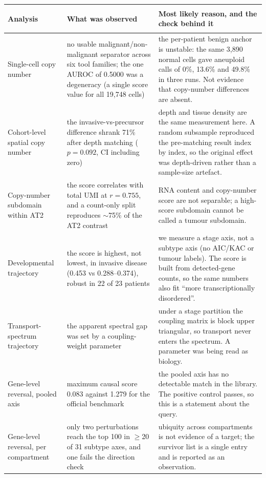 \begin{table}[!ht]
\centering
\scriptsize
\begin{tabularx}{\textwidth}{@{}>{\itshape\raggedright\arraybackslash}p{94pt}>{\raggedright\arraybackslash}p{152pt}X@{}}
\toprule
\tabheadfont Analysis & \tabheadfont What was observed & \tabheadfont Most likely reason, and the check behind it \\
\midrule
Single-cell copy number & no usable malignant/non-malignant separator across six tool families; the one AUROC of 0.5000 was a degeneracy (a single score value for all 19{,}748 cells) & the per-patient benign anchor is unstable: the same 3{,}890 normal cells gave aneuploid calls of 0\%, 13.6\% and 49.8\% in three runs. Not evidence that copy-number differences are absent. \\
\addlinespace[2pt]
Cohort-level spatial copy number & the invasive-vs-precursor difference shrank 71\% after depth matching ($p = 0.092$, CI including zero) & depth and tissue density are the same measurement here. A random subsample reproduced the pre-matching result index by index, so the original effect was depth-driven rather than a sample-size artefact. \\
\addlinespace[2pt]
Copy-number subdomain within AT2 & the score correlates with total UMI at $r = 0.755$, and a count-only split reproduces $\sim$75\% of the AT2 contrast & RNA content and copy-number score are not separable; a high-score subdomain cannot be called a tumour subdomain. \\
\addlinespace[2pt]
Developmental trajectory & the score is highest, not lowest, in invasive disease (0.453 vs 0.288--0.374), robust in 22 of 23 patients & we measure a stage axis, not a subtype axis (no AIC/KAC or tumour labels). The score is built from detected-gene counts, so the same numbers also fit ``more transcriptionally disordered''. \\
\addlinespace[2pt]
Transport-spectrum trajectory & the apparent spectral gap was set by a coupling-weight parameter & under a stage partition the coupling matrix is block upper triangular, so transport never enters the spectrum. A parameter was being read as biology. \\
\addlinespace[2pt]
Gene-level reversal, pooled axis & maximum causal score 0.083 against 1.279 for the official benchmark & the pooled axis has no detectable match in the library. The positive control passes, so this is a statement about the query. \\
\addlinespace[2pt]
Gene-level reversal, per compartment & only two perturbations reach the top 100 in $\geq$20 of 31 subtype axes, and one fails the direction check & ubiquity across compartments is not evidence of a target; the survivor list is a single entry and is reported as an observation. \\

\end{tabularx}
\end{table}
